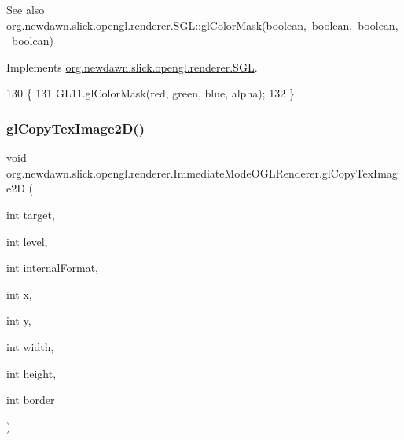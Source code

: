 \begin{DoxySeeAlso}{See also}
\mbox{\hyperlink{interfaceorg_1_1newdawn_1_1slick_1_1opengl_1_1renderer_1_1_s_g_l_a35f9b484d84c168623bc7236152f2d50}{org.\+newdawn.\+slick.\+opengl.\+renderer.\+S\+G\+L\+::gl\+Color\+Mask(boolean, boolean, boolean, boolean)}} 
\end{DoxySeeAlso}


Implements \mbox{\hyperlink{interfaceorg_1_1newdawn_1_1slick_1_1opengl_1_1renderer_1_1_s_g_l_a35f9b484d84c168623bc7236152f2d50}{org.\+newdawn.\+slick.\+opengl.\+renderer.\+S\+GL}}.


\begin{DoxyCode}
130                                                                                      \{
131         GL11.glColorMask(red, green, blue, alpha);
132     \}
\end{DoxyCode}
\mbox{\label{classorg_1_1newdawn_1_1slick_1_1opengl_1_1renderer_1_1_immediate_mode_o_g_l_renderer_ac06c5062e5983c702f01cf67a5ec2d1c}} 
\subsubsection{\texorpdfstring{gl\+Copy\+Tex\+Image2\+D()}{glCopyTexImage2D()}}
{\footnotesize\ttfamily void org.\+newdawn.\+slick.\+opengl.\+renderer.\+Immediate\+Mode\+O\+G\+L\+Renderer.\+gl\+Copy\+Tex\+Image2D (\begin{DoxyParamCaption}\item[{int}]{target,  }\item[{int}]{level,  }\item[{int}]{internal\+Format,  }\item[{int}]{x,  }\item[{int}]{y,  }\item[{int}]{width,  }\item[{int}]{height,  }\item[{int}]{border }\end{DoxyParamCaption})\hspace{0.3cm}{\ttfamily [inline]}}


